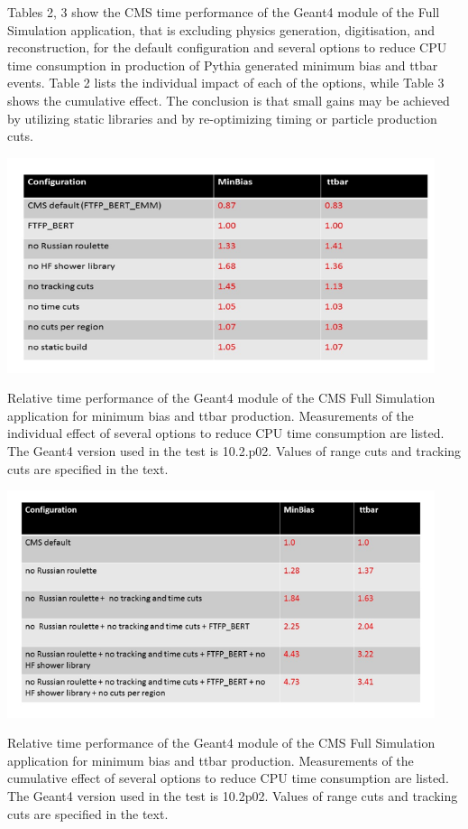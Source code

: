 \documentclass[12pt,a4paper]{article}
\begin{document}
{Tables 2, 3 show the CMS time performance of the Geant4 module of the
Full Simulation application, that is excluding physics generation,
digitisation, and reconstruction, for the default configuration and
several options to reduce CPU time consumption in production of Pythia
generated minimum bias and ttbar events. Table 2 lists the
individual impact of each of the options, while Table 3 shows the
cumulative effect. The conclusion is that small gains may be achieved by
utilizing static libraries and by re-optimizing timing or particle
production cuts. 

\begin{table}[bthp]
\vspace*{0.3cm}
\centering
\includegraphics[width=0.94\textwidth]{image16.png}
\caption{Relative time performance of the Geant4 module of the CMS Full
Simulation application for minimum bias and ttbar production.
Measurements of the individual effect of several options to reduce CPU
time consumption are listed. The Geant4 version used in the test is
10.2.p02. Values of range cuts and tracking cuts are specified in the
text.}
\label{table:table2}
\end{table}

\begin{table}[bthp]
\vspace*{0.3cm}
\centering
\includegraphics[width=0.94\textwidth]{image17.png}
\caption{Relative time performance of the Geant4 module of the CMS Full
Simulation application for minimum bias and ttbar production.
Measurements of the cumulative effect of several options to reduce CPU
time consumption are listed. The Geant4 version used in the test is
10.2p02. Values of range cuts and tracking cuts are specified in the text.}
\label{table:table3}
\end{table}

}
\end{document}
